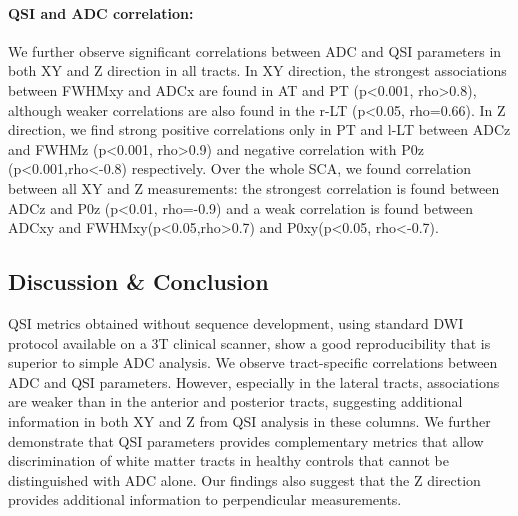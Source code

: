 \paragraph{QSI and ADC correlation:} We further observe significant correlations between ADC and QSI parameters in both XY and Z direction in all tracts. In XY direction, the strongest associations between FWHMxy and ADCx are found in AT and PT (p<0.001, rho>0.8), although weaker correlations are also found in the r-LT (p<0.05, rho=0.66). In Z direction, we find strong positive correlations only in PT and l-LT between ADCz and FWHMz (p<0.001, rho>0.9) and negative correlation with P0z (p<0.001,rho<-0.8) respectively. Over the whole SCA, we found correlation between all XY and Z measurements: the strongest correlation is found between ADCz and P0z (p<0.01, rho=-0.9) and a weak correlation is found between ADCxy and FWHMxy(p<0.05,rho>0.7) and P0xy(p<0.05, rho<-0.7). 
\subsection*{Discussion \& Conclusion} QSI metrics obtained without sequence development, using standard DWI protocol available on a 3T clinical scanner, show a good reproducibility that is superior to simple ADC analysis. We observe tract-specific correlations between ADC and QSI parameters. However, especially in the lateral tracts, associations are weaker than in the anterior and posterior tracts, suggesting additional information in both XY and Z from QSI analysis in these columns. We further demonstrate that QSI parameters provides complementary metrics that allow discrimination of white matter tracts in healthy controls that cannot be distinguished with ADC alone. Our findings also suggest that the Z direction provides additional information to perpendicular measurements.
